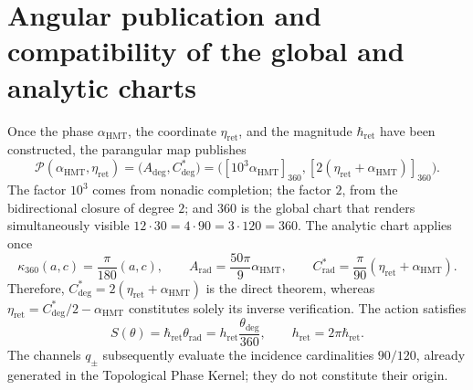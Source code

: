\section{Angular publication and compatibility of the global and analytic charts}
\label{sec:sucesor-102-c14-publicacion-parangular}

Once the phase \(\alpha_{\mathrm{HMT}}\), the coordinate
\(\eta_{\mathrm{ret}}\), and the magnitude \(\hbar_{\mathrm{ret}}\) have been constructed, the
parangular map publishes
\begin{equation}
 \mathcal P(\alpha_{\mathrm{HMT}},\eta_{\mathrm{ret}})
 =\bigl(A_{\deg},C^*_{\deg}\bigr)
 =\bigl([10^3\alpha_{\mathrm{HMT}}]_{360},
        [2(\eta_{\mathrm{ret}}+\alpha_{\mathrm{HMT}})]_{360}\bigr).
 \label{eq:sucesor-102-c14-mapa-parangular}
\end{equation}
The factor \(10^3\) comes from nonadic completion; the factor \(2\),
from the bidirectional closure of degree \(2\); and \(360\) is the global chart
that renders simultaneously visible
\(12\cdot30=4\cdot90=3\cdot120=360\).
The analytic chart applies once
\begin{equation}
 \kappa_{360}(a,c)=\frac{\pi}{180}(a,c),
 \qquad
 A_{\mathrm{rad}}=\frac{50\pi}{9}\alpha_{\mathrm{HMT}},
 \qquad
 C^*_{\mathrm{rad}}
 =\frac{\pi}{90}(\eta_{\mathrm{ret}}+\alpha_{\mathrm{HMT}}).
 \label{eq:sucesor-102-c14-cartas}
\end{equation}
Therefore,
\(C^*_{\deg}=2(\eta_{\mathrm{ret}}+\alpha_{\mathrm{HMT}})\) is the
direct theorem, whereas
\(\eta_{\mathrm{ret}}=C^*_{\deg}/2-\alpha_{\mathrm{HMT}}\) constitutes
solely its inverse verification. The action satisfies
\begin{equation}
 S(\theta)=\hbar_{\mathrm{ret}}\theta_{\mathrm{rad}}
 =h_{\mathrm{ret}}\frac{\theta_{\deg}}{360},
 \qquad h_{\mathrm{ret}}=2\pi\hbar_{\mathrm{ret}}.
 \label{eq:sucesor-102-c14-accion-cartas}
\end{equation}
The channels \(q_\pm\) subsequently evaluate the incidence cardinalities
\(90/120\), already generated in the Topological Phase Kernel; they do not constitute their
origin.
